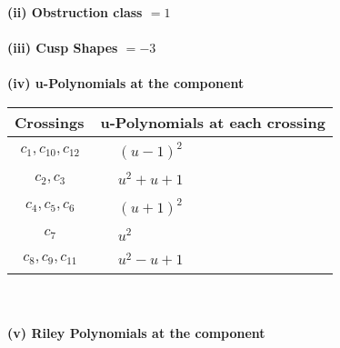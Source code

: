 \documentclass[1p]{elsarticle_modified}
\theoremstyle{definition}
\begin{document}
\flushleft \textbf{(ii) Obstruction class $= 1$}\\~\\
\flushleft \textbf{(iii) Cusp Shapes $= -3$}\\~\\
\newpage\renewcommand{\arraystretch}{1}
\flushleft \textbf{(iv) u-Polynomials at the component}\newline \\
\begin{tabular}{m{50pt}|m{274pt}}
Crossings & \hspace{64pt}u-Polynomials at each crossing \\
\hline $$\begin{aligned}c_{1},c_{10},c_{12}\end{aligned}$$&$\begin{aligned}
&(u-1)^2
\end{aligned}$\\
\hline $$\begin{aligned}c_{2},c_{3}\end{aligned}$$&$\begin{aligned}
&u^2+u+1
\end{aligned}$\\
\hline $$\begin{aligned}c_{4},c_{5},c_{6}\end{aligned}$$&$\begin{aligned}
&(u+1)^2
\end{aligned}$\\
\hline $$\begin{aligned}c_{7}\end{aligned}$$&$\begin{aligned}
&u^2
\end{aligned}$\\
\hline $$\begin{aligned}c_{8},c_{9},c_{11}\end{aligned}$$&$\begin{aligned}
&u^2- u+1
\end{aligned}$\\
\hline
\end{tabular}\\~\\
\newpage\renewcommand{\arraystretch}{1}
\flushleft \textbf{(v) Riley Polynomials at the component}\newline \\
\end{document}
